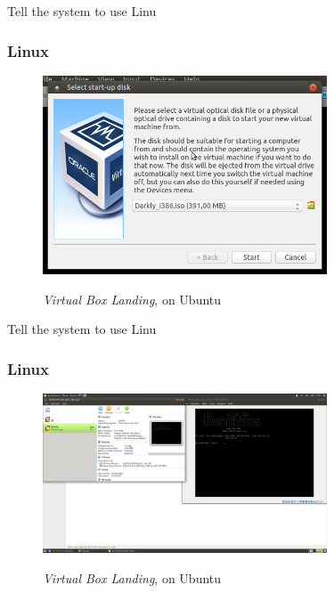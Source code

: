 Tell the system to use Linu
\subsubsection{Linux}

\begin{figure}[!htb]
    \centering
    \includegraphics[width=0.752\textwidth]{images/00-08.png}\\[0cm]  
    \caption[Virtual Box]{\emph{Virtual Box Landing}, on Ubuntu}
    \label{fig:00-08 - Linux Virtual Box Landing} 
\end{figure}

Tell the system to use Linu
\subsubsection{Linux}

\begin{figure}[!htb]
    \centering
    \includegraphics[width=0.752\textwidth]{images/00-09.png}\\[0cm]  
    \caption[Virtual Box]{\emph{Virtual Box Landing}, on Ubuntu}
    \label{fig:00-09 - Linux Virtual Box Landing} 
\end{figure}

